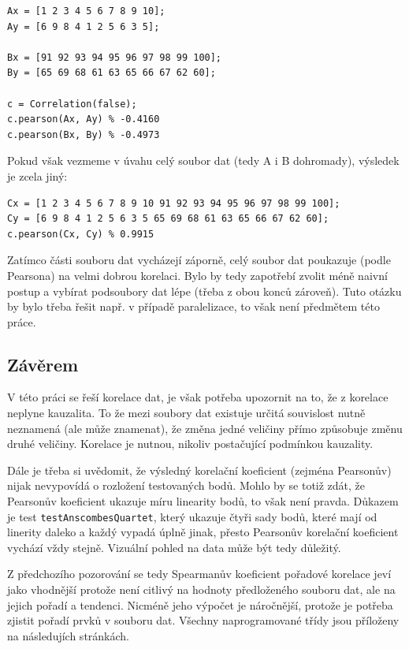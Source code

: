 \begin{verbatim}
Ax = [1 2 3 4 5 6 7 8 9 10];
Ay = [6 9 8 4 1 2 5 6 3 5];

Bx = [91 92 93 94 95 96 97 98 99 100];
By = [65 69 68 61 63 65 66 67 62 60];

c = Correlation(false);
c.pearson(Ax, Ay) % -0.4160
c.pearson(Bx, By) % -0.4973
\end{verbatim}

Pokud však vezmeme v úvahu celý soubor dat (tedy A i B dohromady), výsledek je zcela jiný:
\begin{verbatim}
Cx = [1 2 3 4 5 6 7 8 9 10 91 92 93 94 95 96 97 98 99 100];
Cy = [6 9 8 4 1 2 5 6 3 5 65 69 68 61 63 65 66 67 62 60];
c.pearson(Cx, Cy) % 0.9915
\end{verbatim}

Zatímco části souboru dat vycházejí záporně, celý soubor dat poukazuje (podle Pearsona) na velmi dobrou korelaci. Bylo by tedy zapotřebí zvolit méně naivní postup a vybírat podsoubory dat lépe (třeba z obou konců zároveň). Tuto otázku by bylo třeba řešit např. v případě paralelizace, to však není předmětem této práce.

\subsection*{Závěrem}
V této práci se řeší korelace dat, je však potřeba upozornit na to, že z korelace neplyne kauzalita. To že mezi soubory dat existuje určitá souvislost nutně neznamená (ale může znamenat), že změna jedné veličiny přímo způsobuje změnu druhé veličiny. Korelace je nutnou, nikoliv postačující podmínkou kauzality.

Dále je třeba si uvědomit, že výsledný korelační koeficient (zejména Pearsonův) nijak nevypovídá o rozložení testovaných bodů. Mohlo by se totiž zdát, že Pearsonův koeficient ukazuje míru linearity bodů, to však není pravda. Důkazem je test \texttt{testAnscombesQuartet}, který ukazuje čtyři sady bodů, které mají od linerity daleko a každý vypadá úplně jinak, přesto Pearsonův korelační koeficient vychází vždy stejně. Vizuální pohled na data může být tedy důležitý.

Z předchozího pozorování se tedy Spearmanův koeficient pořadové korelace jeví jako vhodnější protože není citlivý na hodnoty předloženého souboru dat, ale na jejich pořadí a tendenci. Nicméně jeho výpočet je náročnější, protože je potřeba zjistit pořadí prvků v souboru dat. Všechny naprogramované třídy jsou příloženy na následujích stránkách.

